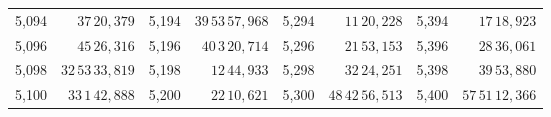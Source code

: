 \begin{tabular}{|r|r||r|r||r|r||r|r|}
5,094 & \(37\,20,\!379\) & 5,194 & \(39\,53\,57,\!968\) & 5,294 & \(11\,20,\!228\) & 5,394 & \(17\,18,\!923\) \\
5,096 & \(45\,26,\!316\) & 5,196 & \(40\,3\,20,\!714\) & 5,296 & \(21\,53,\!153\) & 5,396 & \(28\,36,\!061\) \\
5,098 & \(32\,53\,33,\!819\) & 5,198 & \(12\,44,\!933\) & 5,298 & \(32\,24,\!251\) & 5,398 & \(39\,53,\!880\) \\[1pt]
5,100 & \(33\,1\,42,\!888\) & 5,200 & \(22\,10,\!621\) & 5,300 & \(48\,42\,56,\!513\) & 5,400 & \(57\,51\,12,\!366\) \\
\hline
\end{tabular}\par
\endgroup
\clearpage
